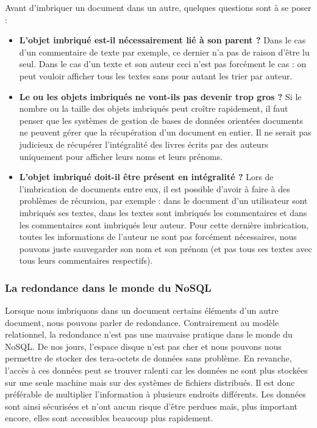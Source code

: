   Avant d'imbriquer un document dans un autre, quelques questions sont à se poser :
  \vspace{10px}
  \begin{itemize}
    \item \textbf{L'objet imbriqué est-il nécessairement lié à son parent ?} Dans le cas d'un commentaire de texte par exemple, ce dernier n'a pas de raison d'être lu seul. Dans le cas d'un texte et son auteur ceci n'est pas forcément le cas : on peut vouloir afficher tous les textes sans pour autant les trier par auteur.
    \item \textbf{Le ou les objets imbriqués ne vont-ils pas devenir trop gros ?} Si le nombre ou la taille des objets imbriqués peut croître rapidement, il faut penser que les systèmes de gestion de bases de données orientées documents ne peuvent gérer que la récupération d'un document en entier. Il ne serait pas judicieux de récupérer l'intégralité des livres écrits par des auteurs uniquement pour afficher leurs noms et leurs prénoms.
    \item \textbf{L'objet imbriqué doit-il être présent en intégralité ?} Lors de l'imbrication de documents entre eux, il est possible d'avoir à faire à des problèmes de récursion, par exemple : dans le document d'un utilisateur sont imbriqués ses textes, dans les textes sont imbriqués les commentaires et dans les commentaires sont imbriqués leur auteur. Pour cette dernière imbrication, toutes les informations de l'auteur ne sont pas forcément nécessaires, nous pouvons juste sauvegarder son nom et son prénom (et pas tous ses textes avec tous leurs commentaires respectifs).
  \end{itemize}

\subsubsection{La redondance dans le monde du NoSQL}

  Lorsque nous imbriquons dans un document certains éléments d'un autre document, nous pouvons parler de redondance. Contrairement au modèle relationnel, la redondance n'est pas une mauvaise pratique dans le monde du NoSQL. De nos jours, l'espace disque n'est pas cher et nous pouvons nous permettre de stocker des tera-octets de données sans problème. En revanche, l'accès à ces données peut se trouver ralenti car les données ne sont plus stockées sur une seule machine mais sur des systèmes de fichiers distribués. Il est donc préférable de multiplier l'information à plusieurs endroits différents. Les données sont ainsi sécurisées et n'ont aucun risque d'être perdues mais, plus important encore, elles sont accessibles beaucoup plus rapidement.\\

